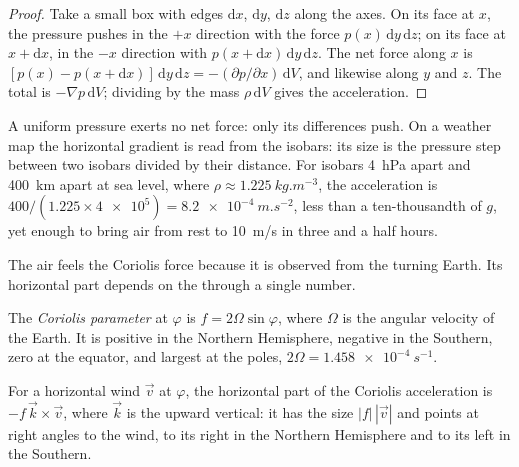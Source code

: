 \begin{proof}
Take a small box with edges $\mathrm dx$, $\mathrm dy$, $\mathrm dz$ along the
axes. On its face at $x$, the pressure pushes in the $+x$ direction with the force
$p(x)\,\mathrm dy\,\mathrm dz$; on its face at $x + \mathrm dx$, in the $-x$
direction with $p(x + \mathrm dx)\,\mathrm dy\,\mathrm dz$. The net force along
$x$ is $[p(x) - p(x + \mathrm dx)]\,\mathrm dy\,\mathrm dz = -(\partial p/\partial
x)\,\mathrm dV$, and likewise along $y$ and $z$. The total is $-\nabla p\,
\mathrm dV$; dividing by the mass $\rho\,\mathrm dV$ gives the acceleration.
\end{proof}

A uniform pressure exerts no net force: only its differences push. On a weather
map the horizontal gradient is read from the isobars: its size is the pressure step
between two isobars divided by their distance. For isobars \qty{4}{hPa} apart and
\qty{400}{km} apart at sea level, where $\rho \approx \qty{1.225}{kg.m^{-3}}$, the
acceleration is $400/(1.225 \times \num{4e5}) = \qty{8.2e-4}{m.s^{-2}}$, less than
a ten-thousandth of $g$, yet enough to bring air from rest to \qty{10}{m/s} in
three and a half hours.

The air feels the Coriolis force because it is observed from the turning Earth. Its
horizontal part depends on the  through a single number.

\begin{definition}\label{def:b1:atmospheric-circulation:coriolis-parameter}
The \emph{Coriolis parameter} at  $\varphi$ is
$f = 2\Omega\sin\varphi$, where $\Omega$ is the angular velocity of the Earth. It is
positive in the Northern Hemisphere, negative in the Southern, zero at the equator,
and largest at the poles, $2\Omega = \qty{1.458e-4}{s^{-1}}$.
\end{definition}

\begin{proposition}\label{prop:b1:atmospheric-circulation:coriolis}
For a horizontal wind $\vec v$ at  $\varphi$, the horizontal part of the
Coriolis acceleration is $-f\,\vec k\times\vec v$, where $\vec k$ is the upward
vertical: it has the size $|f|\,|\vec v|$ and points at right angles to the wind,
to its right in the Northern Hemisphere and to its left in the Southern.
\end{proposition}


